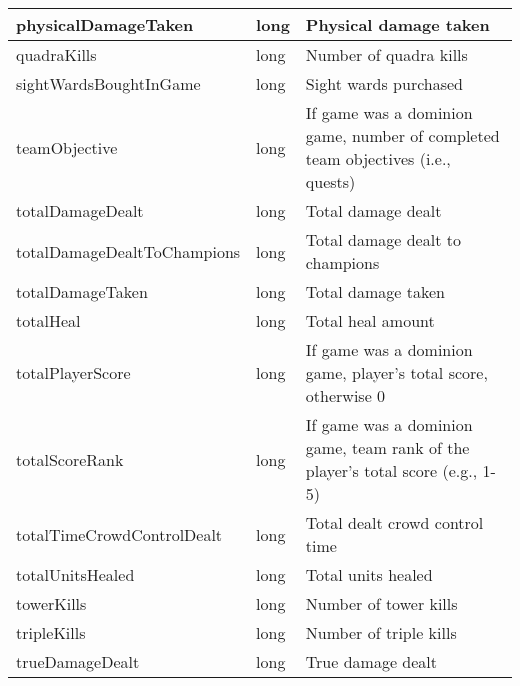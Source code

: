 \begin{table}[!htb]
\begin{tabular}{|llp{5cm}|}
physicalDamageTaken             & long               & Physical damage taken                                                           \\ \hline
quadraKills                     & long               & Number of quadra kills                                                          \\ \hline
sightWardsBoughtInGame          & long               & Sight wards purchased                                                           \\ \hline
teamObjective                   & long               & If game was a dominion game, number of completed team objectives (i.e., quests) \\ \hline
totalDamageDealt                & long               & Total damage dealt                                                              \\ \hline
totalDamageDealtToChampions     & long               & Total damage dealt to champions                                                 \\ \hline
totalDamageTaken                & long               & Total damage taken                                                              \\ \hline
totalHeal                       & long               & Total heal amount                                                               \\ \hline
totalPlayerScore                & long               & If game was a dominion game, player's total score, otherwise 0                  \\ \hline
totalScoreRank                  & long               & If game was a dominion game, team rank of the player's total score (e.g., 1-5)  \\ \hline
totalTimeCrowdControlDealt      & long               & Total dealt crowd control time                                                  \\ \hline
totalUnitsHealed                & long               & Total units healed                                                              \\ \hline
towerKills                      & long               & Number of tower kills                                                           \\ \hline
tripleKills                     & long               & Number of triple kills                                                          \\ \hline
trueDamageDealt                 & long               & True damage dealt                                                               \\ \hline

\end{tabular}
\end{table}
